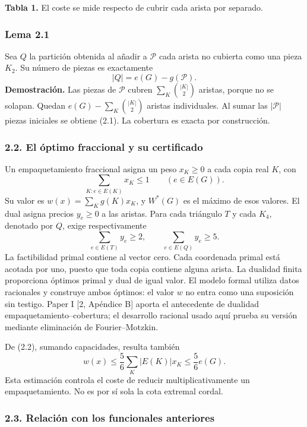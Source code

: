 \documentclass[spanish,11pt,a4paper]{article}
\begin{document}
\textbf{Tabla 1.} El coste se mide respecto de cubrir cada arista por separado.

\subsubsection{Lema 2.1}\label{lema-2.1}

Sea \(Q\) la partición obtenida al añadir a \(\mathcal P\) cada arista no cubierta como una pieza \(K_2\). Su número de piezas es exactamente \[
|Q|=e(G)-g(\mathcal P).
\tag{2.1}
\] \textbf{Demostración.} Las piezas de \(\mathcal P\) cubren \(\sum_K\binom{|K|}{2}\) aristas, porque no se solapan. Quedan \(e(G)-\sum_K\binom{|K|}{2}\) aristas individuales. Al sumar las \(|\mathcal P|\) piezas iniciales se obtiene (2.1). La cobertura es exacta por construcción.

\subsubsection{2.2. El óptimo fraccional y su certificado}\label{el-uxf3ptimo-fraccional-y-su-certificado}

Un empaquetamiento fraccional asigna un peso \(x_K\ge0\) a cada copia real \(K\), con \[
\sum_{K:e\in E(K)}x_K\le1\qquad(e\in E(G)).
\tag{2.2}
\] Su valor es \(w(x)=\sum_K g(K)x_K\), y \(W^*(G)\) es el máximo de esos valores. El dual asigna precios \(y_e\ge0\) a las aristas. Para cada triángulo \(T\) y cada \(K_4\), denotado por \(Q\), exige respectivamente \[
\sum_{e\in E(T)}y_e\ge2,\qquad
\sum_{e\in E(Q)}y_e\ge5.
\tag{2.3}
\] La factibilidad primal contiene al vector cero. Cada coordenada primal está acotada por uno, puesto que toda copia contiene alguna arista. La dualidad finita proporciona óptimos primal y dual de igual valor. El modelo formal utiliza datos racionales y construye ambos óptimos: el valor \(w\) no entra como una suposición sin testigo. Paper I {[}2, Apéndice B{]} aporta el antecedente de dualidad empaquetamiento--cobertura; el desarrollo racional usado aquí prueba su versión mediante eliminación de Fourier--Motzkin.

De (2.2), sumando capacidades, resulta también \[
w(x)\le\frac56\sum_K |E(K)|x_K\le\frac56e(G).
\tag{2.4}
\] Esta estimación controla el coste de reducir multiplicativamente un empaquetamiento. No es por sí sola la cota extremal cordal.

\subsubsection{2.3. Relación con los funcionales anteriores}\label{relaciuxf3n-con-los-funcionales-anteriores}
\end{document}
